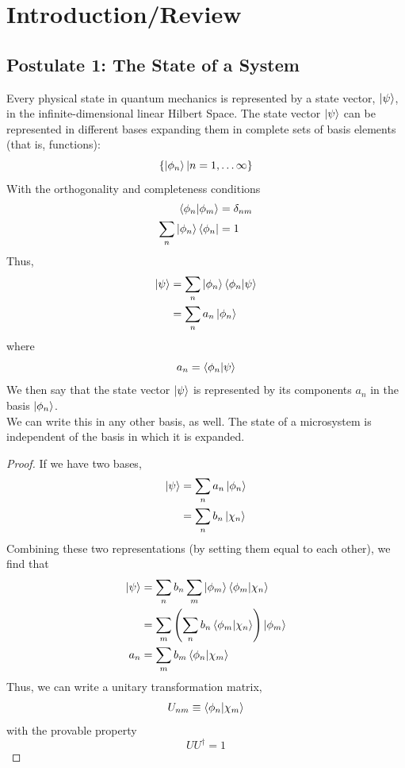 \documentclass[a4paper]{article}
\begin{document}
\maketitle

\tableofcontents

\section{Introduction/Review}

\subsection{Postulate 1: The State of a System} \label{intro}
Every physical state in quantum mechanics is represented by a state vector,
$\left\lvert \psi\right\rangle$, in the infinite-dimensional linear Hilbert Space. The state
vector $\left\lvert \psi\right\rangle$ can be represented in different bases expanding them in
complete sets of basis elements (that is, functions):
\[
	\{\left\lvert \phi_n\right\rangle | n=1,\ldots \infty\}
\]
With the orthogonality and completeness conditions
\begin{align*}
	\left\langle \phi_n\middle\vert \phi_m \right\rangle &= \delta_{nm}\\
	\sum_n\left\lvert \phi_n\right\rangle\left\langle \phi_n \right\rvert &= 1
\end{align*}
Thus,
\begin{align*}
	\left\lvert \psi\right\rangle &= \sum_n\left\lvert \phi_n\right\rangle\left\langle \phi_n\middle\vert \psi \right\rangle\\
		    &= \sum_n a_n\left\lvert \phi_n\right\rangle\\
\end{align*}
where
	\[ a_n = \left\langle \phi_n\middle\vert \psi \right\rangle \]
We then say that the state vector $\left\lvert \psi\right\rangle$ is represented by its
components $a_n$ in the basis $\left\lvert \phi_n\right\rangle$.\\
We can write this in any other basis, as well. The state of a microsystem is
independent of the basis in which it is expanded.
\begin{proof}
If we have two bases,
\begin{align*}
	\left\lvert \psi\right\rangle &= \sum_n a_n\left\lvert \phi_n\right\rangle\\
		    &= \sum_n b_n\left\lvert \chi_n\right\rangle\\
\end{align*}
Combining these two representations (by setting them equal to each other),
we find that
\begin{align*}
	\left\lvert \psi\right\rangle &= \sum_n b_n\sum_m \left\lvert \phi_m\right\rangle\left\langle \phi_m\middle\vert \chi_n \right\rangle\\
		    &= \sum_m\left(\sum_n b_n\left\langle \phi_m\middle\vert \chi_n \right\rangle\right)
			\left\lvert \phi_m\right\rangle\\
	a_n &= \sum_m b_m \left\langle \phi_n\middle\vert \chi_m \right\rangle
\end{align*}
Thus, we can write a unitary transformation matrix,
\[ U_{nm} \equiv \left\langle \phi_n\middle\vert \chi_m \right\rangle \]
with the provable property
\[ U U^\dagger = 1 \]
\end{proof}
\end{document}
